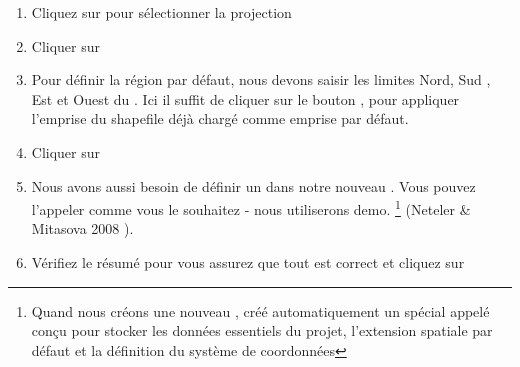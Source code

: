 \begin{enumerate}
  \item Cliquez sur  pour sélectionner la projection
  \item Cliquer sur 
  \item Pour définir la région par défaut, nous devons saisir les limites Nord, Sud , Est et Ouest du . Ici il suffit de cliquer sur le bouton , pour appliquer l'emprise du shapefile  déjà chargé comme emprise par défaut.
  \item Cliquer sur 
    \item Nous avons aussi besoin de définir un  dans notre nouveau . Vous pouvez l'appeler comme vous le souhaitez - nous utiliserons demo. \footnote{Quand nous créons une nouveau , \grass créé automatiquement un  spécial appelé  conçu pour stocker les données essentiels du projet, l'extension spatiale par défaut et la définition du système de coordonnées} (Neteler \& Mitasova 2008  \cite{neteler_mitasova08}).
  \item Vérifiez le résumé pour vous assurez que tout est correct et cliquez sur 

\end{enumerate}
